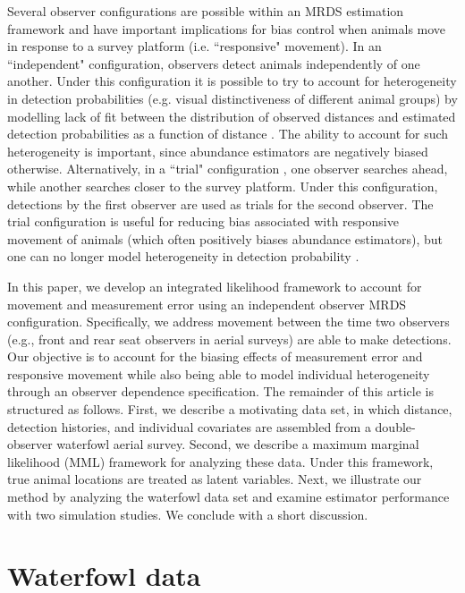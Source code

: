 \documentclass[aoas,preprint]{imsart}
\numberwithin{equation}{section}
\theoremstyle{plain}
\begin{document}
Several observer configurations are possible within an MRDS estimation framework \citep{BurtEtAl2014} and have important implications for bias control when animals move in response to a survey platform (i.e. ``responsive" movement).  In an ``independent" configuration, observers detect animals independently of one another.  Under this configuration it is possible to try to account for heterogeneity in detection probabilities (e.g. visual distinctiveness of different animal groups) by modelling lack of fit between the distribution of observed distances and estimated detection probabilities as a function of distance \citep{LaakeBorchers2004,BorchersEtAl2006,BucklandEtAl2010}.  The ability to account for such heterogeneity is important, since abundance estimators are negatively biased otherwise. Alternatively, in a ``trial" configuration \citep{BucklandTurnock1992}, one observer searches ahead, while another searches closer to the survey platform.  Under this configuration, detections by the first observer are used as trials for the second observer.  The trial configuration is useful for reducing bias associated with responsive movement of animals (which often positively biases abundance estimators), but one can no longer model heterogeneity in detection probability \citep{BurtEtAl2014}.

In this paper, we develop an integrated likelihood framework to account for movement and measurement error using an independent observer MRDS configuration.  Specifically, we address movement between the time two observers (e.g., front and rear seat observers in aerial surveys) are able to make detections.  Our objective is to account for the biasing effects of measurement error and responsive movement while also being able to model individual heterogeneity through an observer dependence specification.  The remainder of this article is structured as follows.  First, we describe a motivating data set, in which distance, detection histories, and individual covariates are assembled from a double-observer waterfowl aerial survey.  Second, we describe a maximum marginal likelihood (MML) framework for analyzing these data.  Under this framework, true animal locations are treated as latent variables.  Next, we illustrate our method by analyzing the waterfowl data set and examine estimator performance with two simulation studies.  We conclude with a short discussion.


\section{Waterfowl data}
\end{document}
